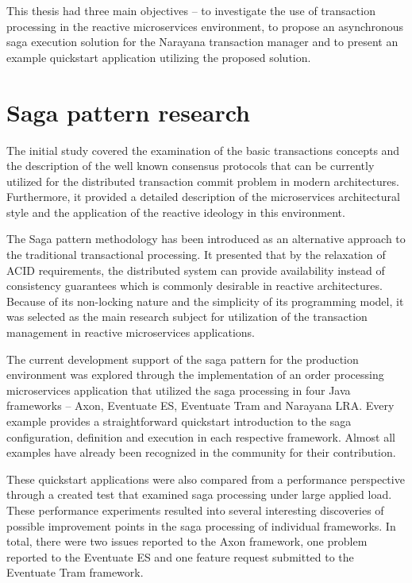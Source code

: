 \documentclass[oneside,
  digital, %
  table,   %
  lof,     %
  lot,     %
]{fithesis3}
\begin{document}
This thesis had three main objectives -- to investigate the use of transaction processing in the reactive microservices environment, to propose an asynchronous saga execution solution for the Narayana transaction manager and to present an example quickstart application utilizing the proposed solution.

\section{Saga pattern research}

The initial study covered the examination of the basic transactions concepts and the description of the well known consensus protocols that can be currently utilized for the distributed transaction commit problem in modern architectures. Furthermore, it provided a detailed description of the microservices architectural style and the application of the reactive ideology in this environment.

The Saga pattern \cite{sagas_publ} methodology has been introduced as an alternative approach to the traditional transactional processing. It presented that by the relaxation of ACID requirements, the distributed system can provide availability instead of consistency guarantees which is commonly desirable in reactive architectures. Because of its non-locking nature and the simplicity of its programming model, it was selected as the main research subject for utilization of the transaction management in reactive microservices applications.

The current development support of the saga pattern for the production environment was explored through the implementation of an order processing microservices application that utilized the saga processing in four Java frameworks -- Axon, Eventuate ES, Eventuate Tram and Narayana LRA. Every example provides a straightforward quickstart introduction to the saga configuration, definition and execution in each respective framework. Almost all examples have already been recognized in the community for their contribution.

These quickstart applications were also compared from a performance perspective through a created test that examined saga processing under large applied load. These performance experiments resulted into several interesting discoveries of possible improvement points in the saga processing of individual frameworks. In total, there were two issues reported to the Axon framework, one problem reported to the Eventuate ES and one feature request submitted to the Eventuate Tram framework.
\end{document}
